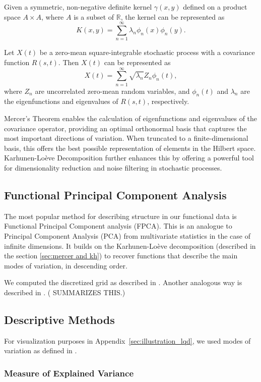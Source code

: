 \begin{theorem}
Given a symmetric, non-negative definite kernel \(\gamma(x, y)\) defined on a product space
\(A \times A\), where \(A\) is a subset of \(\mathbb{R}\), the kernel can be represented
as
\[
K(x, y) = \sum_{n=1}^{\infty} \lambda_n \phi_n(x) \phi_n(y).
\]
\end{theorem}
\begin{theorem}
Let \(X(t)\) be a zero-mean square-integrable stochastic process with a covariance
function \(R(s, t)\). Then \(X(t)\) can be represented as
\[
X(t) = \sum_{n=1}^{\infty} \sqrt{\lambda_n} Z_n \phi_n(t),
\]
where \(Z_n\) are uncorrelated zero-mean random variables, and \(\phi_n(t)\) and
\(\lambda_n\) are the eigenfunctions and eigenvalues of \(R(s, t)\), respectively.
\end{theorem}
Mercer's Theorem enables the calculation of eigenfunctions and eigenvalues of the
covariance operator, providing an optimal orthonormal basis that captures the most
important directions of variation. When truncated to a finite-dimensional basis, this
offers the best possible representation of elements in the Hilbert space. Karhunen-Loève
Decomposition further enhances this by offering a powerful tool for dimensionality
reduction and noise filtering in stochastic processes.

\subsection{Functional Principal Component Analysis}
\label{sec:fpca}
The most popular method for describing structure in our functional data is Functional
Principal Component analysis (FPCA). This is an analogue to Principal Component Analysis
(PCA) from multivariate statistics in the case of infinite dimensions. It builds on the
Karhunen-Loève decomposition (described in the section \ref{sec:mercer and kh}) to
recover functions that describe the main modes of variation, in descending order.

We computed the discretized grid as described in \citet[Chapter~8.4.1]{RamsaySilverman2005}. Another analogous way
is described in \textcite{KneipUtikal2001}. (\textcite{Delicado2011} SUMMARIZES THIS.)

\subsection{Descriptive Methods}
\label{sec:fda_descriptives}
For visualization purposes in Appendix~\ref{sec:illustration_lqd}, we used modes of
variation as defined in \textcite{Castro1986}.

\subsubsection{Measure of Explained Variance}
\label{sec:def_fve}
